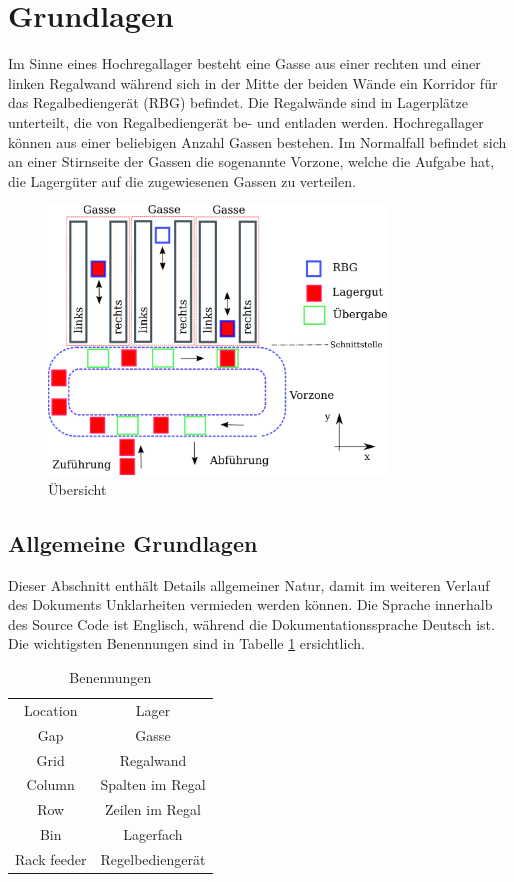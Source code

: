 \section{Grundlagen}
Im Sinne eines Hochregallager besteht eine Gasse aus einer rechten und einer linken Regalwand während sich in der Mitte der beiden Wände ein Korridor für das Regalbediengerät (RBG) befindet. Die Regalwände sind in Lagerplätze unterteilt, die von Regalbediengerät be- und entladen werden. Hochregallager können aus einer beliebigen Anzahl Gassen bestehen. Im Normalfall befindet sich an einer Stirnseite der Gassen die sogenannte Vorzone, welche die Aufgabe hat, die Lagergüter auf die zugewiesenen Gassen zu verteilen. 
%
\begin{figure}[H]
  \begin{center}
    \includegraphics[width=0.8\textwidth]{images/uebersicht.png}
    \caption{Übersicht}
    \label{fig:overview}
  \end{center}
\end{figure}
%

%
\subsection{Allgemeine Grundlagen}
Dieser Abschnitt enthält Details allgemeiner Natur, damit im weiteren Verlauf des Dokuments Unklarheiten vermieden werden können. Die Sprache innerhalb des Source Code ist Englisch, während die Dokumentationssprache Deutsch ist. Die wichtigsten Benennungen sind in Tabelle \ref{tab:desc} ersichtlich.
%
\begin{table}[H]
  \caption{Benennungen}
  \label{tab:desc}

  \begin{center}
    \begin{tabular}{cc}
       Location & Lager\\
       Gap & Gasse\\
       Grid & Regalwand \\
       Column & Spalten im Regal \\
       Row & Zeilen im Regal \\
       Bin & Lagerfach \\
       Rack feeder & Regelbediengerät \\
    \end{tabular}
  \end{center}
\end{table}
%
